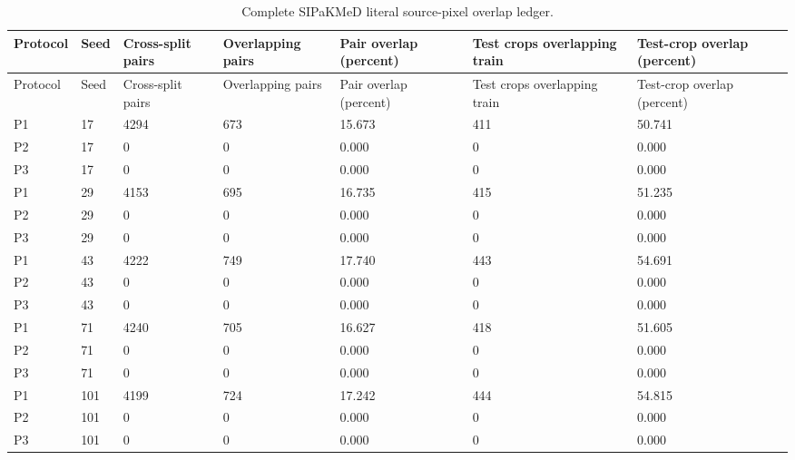 \begin{longtable}{p{1.4cm}p{1.0cm}p{2.0cm}p{2.0cm}p{2.0cm}p{2.8cm}p{2.3cm}}
\caption{Complete SIPaKMeD literal source-pixel overlap ledger.}\label{s1:tab:pixel-seed-ledger}\\
\toprule
Protocol & Seed & Cross-split pairs & Overlapping pairs & Pair overlap (percent) & Test crops overlapping train & Test-crop overlap (percent) \\
\midrule
\endfirsthead
\toprule
Protocol & Seed & Cross-split pairs & Overlapping pairs & Pair overlap (percent) & Test crops overlapping train & Test-crop overlap (percent) \\
\midrule
\endhead
\bottomrule
\endfoot
P1 & 17 & 4294 & 673 & 15.673 & 411 & 50.741 \\ 
P2 & 17 & 0 & 0 & 0.000 & 0 & 0.000 \\ 
P3 & 17 & 0 & 0 & 0.000 & 0 & 0.000 \\ 
P1 & 29 & 4153 & 695 & 16.735 & 415 & 51.235 \\ 
P2 & 29 & 0 & 0 & 0.000 & 0 & 0.000 \\ 
P3 & 29 & 0 & 0 & 0.000 & 0 & 0.000 \\ 
P1 & 43 & 4222 & 749 & 17.740 & 443 & 54.691 \\ 
P2 & 43 & 0 & 0 & 0.000 & 0 & 0.000 \\ 
P3 & 43 & 0 & 0 & 0.000 & 0 & 0.000 \\ 
P1 & 71 & 4240 & 705 & 16.627 & 418 & 51.605 \\ 
P2 & 71 & 0 & 0 & 0.000 & 0 & 0.000 \\ 
P3 & 71 & 0 & 0 & 0.000 & 0 & 0.000 \\ 
P1 & 101 & 4199 & 724 & 17.242 & 444 & 54.815 \\ 
P2 & 101 & 0 & 0 & 0.000 & 0 & 0.000 \\ 
P3 & 101 & 0 & 0 & 0.000 & 0 & 0.000 \\ 
\end{longtable}
